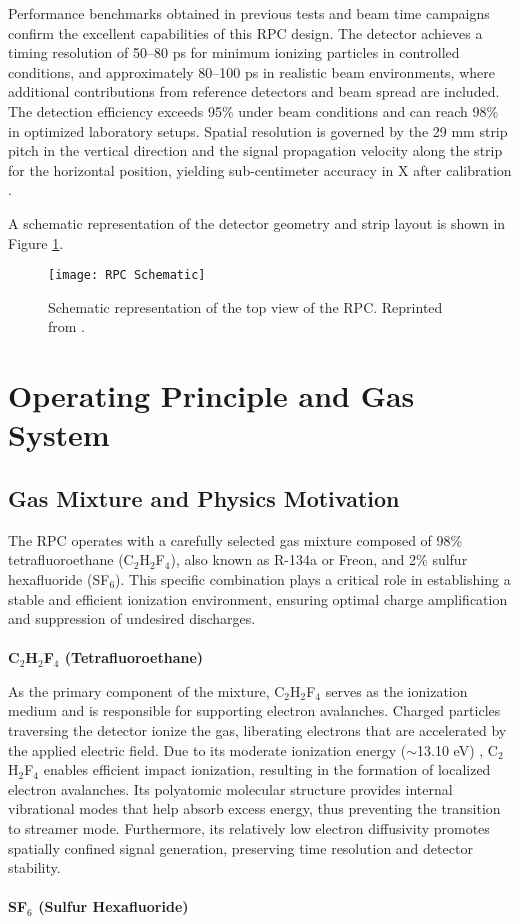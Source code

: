 Performance benchmarks obtained in previous tests and beam time campaigns confirm the excellent capabilities of this \gls{RPC} design. The detector achieves a timing resolution of 50–80 ps for minimum ionizing particles in controlled conditions, and approximately 80–100 ps in realistic beam environments, where additional contributions from reference detectors and beam spread are included. The detection efficiency exceeds 95\% under beam conditions and can reach 98\% in optimized laboratory setups. Spatial resolution is governed by the 29 mm strip pitch in the vertical direction and the signal propagation velocity along the strip for the horizontal position, yielding sub-centimeter accuracy in X after calibration \cite{blanco_ship_2020, xarepe_resistive_2023}.

A schematic representation of the detector geometry and strip layout is shown in Figure \ref{fig:RPCScheme}.

\begin{figure}
	\centering
	\texttt{[image: RPC Schematic]}
	\caption[Top view of the RPC detector]{Schematic representation of the top view of the \gls{RPC}. Reprinted from \cite{blanco_ship_2020}.}
	\label{fig:RPCScheme}
\end{figure}
      


\section{Operating Principle and Gas System}

\subsection{Gas Mixture and Physics Motivation}

The \gls{RPC} operates with a carefully selected gas mixture composed of 98\% tetrafluoroethane (C$_2$H$_2$F$_4$), also known as R-134a or Freon, and 2\% sulfur hexafluoride (SF$_6$). This specific combination plays a critical role in establishing a stable and efficient ionization environment, ensuring optimal charge amplification and suppression of undesired discharges.
\\
\\
\textbf{C$_2$H$_2$F$_4$ (Tetrafluoroethane)}

As the primary component of the mixture, C$_2$H$_2$F$_4$ serves as the ionization medium and is responsible for supporting electron avalanches. Charged particles traversing the detector ionize the gas, liberating electrons that are accelerated by the applied electric field. Due to its moderate ionization energy ($\sim$13.10 eV) \cite{pereira-da-silva_electron_2021}, C$_2$H$_2$F$_4$ enables efficient impact ionization, resulting in the formation of localized electron avalanches. Its polyatomic molecular structure provides internal vibrational modes that help absorb excess energy, thus preventing the transition to streamer mode. Furthermore, its relatively low electron diffusivity promotes spatially confined signal generation, preserving time resolution and detector stability.
\\
\\
\textbf{SF$_6$ (Sulfur Hexafluoride)}

